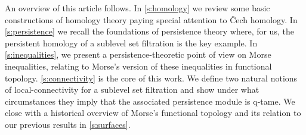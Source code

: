 

An overview of this article follows.
In \cref{s:homology} we review some basic constructions of homology theory paying special attention to \v{C}ech homology.
In \cref{s:persistence} we recall the foundations of persistence theory where, for us, the persistent homology of a sublevel set filtration is the key example.
In \cref{s:inequalities}, we present a persistence-theoretic point of view on Morse inequalities, relating to Morse's version of these inequalities in functional topology.
\cref{s:connectivity} is the core of this work.
We define two natural notions of local-connectivity for a sublevel set filtration and show under what circumstances they imply that the associated persistence module is q-tame.
We close with a historical overview of Morse's functional topology and its relation to our previous results in \cref{s:surfaces}.